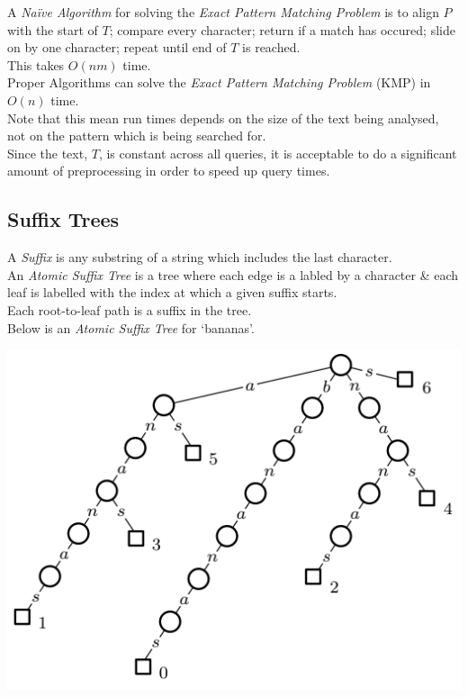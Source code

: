 \documentclass[11pt,a4paper]{article}
\begin{document}
A \textit{Na\"ive Algorithm} for solving the \textit{Exact Pattern Matching Problem} is to align $P$ with the start of $T$; compare every character; return if a match has occured; slide on by one character; repeat until end of $T$ is reached.\\
\nb This takes $O(nm)$ time.\\

Proper Algorithms can solve the \textit{Exact Pattern Matching Problem} (\eg KMP) in $O(n)$ time.\\
Note that this mean run times depends on the size of the text being analysed, not on the pattern which is being searched for.\\

Since the text, $T$, is constant across all queries, it is acceptable to do a significant amount of preprocessing in order to speed up query times.

\subsection{Suffix Trees}

A \textit{Suffix} is any substring of a string which includes the last character.\\

An \textit{Atomic Suffix Tree} is a tree where each edge is a labled by a character \& each leaf is labelled with the index at which a given suffix starts.\\
Each root-to-leaf path is a suffix in the tree.\\

Below is an \textit{Atomic Suffix Tree} for `bananas'.
\begin{center}\includegraphics[scale=.5]{img/atomic_suffix_tree.png}\end{center}
\end{document}
